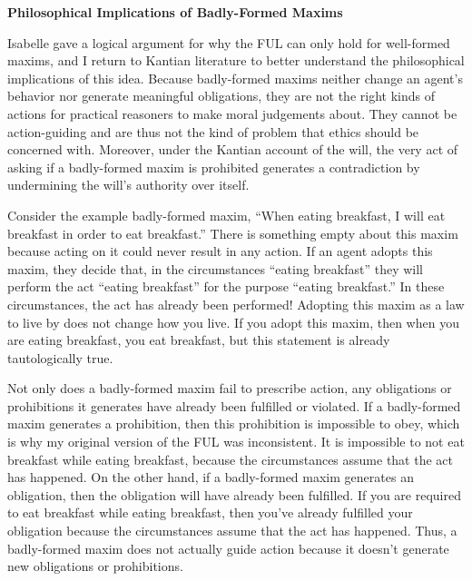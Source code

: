 \begin{isabellebody}
\begin{isamarkuptext}
\noindent \textbf{Philosophical Implications of Badly-Formed Maxims}

Isabelle gave a logical argument for why the FUL can only hold for well-formed maxims, and I return to Kantian
literature to better understand the philosophical implications of this idea. Because badly-formed maxims
neither change an agent's behavior nor generate meaningful obligations, they are not the right kinds of 
actions for practical reasoners to make moral judgements about. They cannot be action-guiding and are thus not the kind of problem that 
ethics should be concerned with. Moreover, under the Kantian account of the will, the very act of asking 
if a badly-formed maxim is prohibited generates a contradiction by undermining the will's authority over itself. 

Consider the example badly-formed maxim, ``When eating breakfast, I will eat breakfast in order to 
eat breakfast.'' There is something empty about this maxim because acting on it could never result in 
any action. If an agent adopts this maxim, 
they decide that, in the circumstances ``eating breakfast'' they will perform the act ``eating breakfast''
for the purpose ``eating breakfast.'' In these circumstances, the act has 
already been performed! Adopting this maxim as a law to live by does not change how you live. If you adopt 
this maxim, then when you are eating breakfast, you eat breakfast, but this statement is already tautologically true. 

Not only does a badly-formed maxim fail to prescribe action, any obligations or prohibitions it 
generates have already been fulfilled or violated. If a badly-formed maxim generates a prohibition, 
then this prohibition is impossible to obey, which is why my original version of the FUL was inconsistent. 
It is impossible to not eat breakfast while eating breakfast, because the circumstances assume that the 
act has happened. On the other hand, if a badly-formed maxim generates an obligation, then the obligation 
will have already been fulfilled. If you are required to eat breakfast while eating breakfast, then you've 
already fulfilled your obligation because the circumstances assume that the act has happened. Thus, 
a badly-formed maxim does not actually guide action because it doesn't generate new obligations or 
prohibitions. 


\end{isamarkuptext}
\end{isabellebody}
